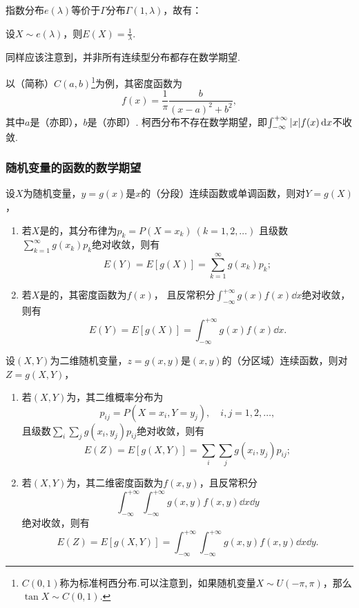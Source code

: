 指数分布\(e(\lambda)\)等价于\(\Gamma\)分布\(\Gamma(1,\lambda)\)，故有：
\begin{theorem}\label{theorem:随机变量的数字特征.指数分布的数学期望}
设\(X \sim e(\lambda)\)，则\(E(X) = \frac{1}{\lambda}\).
\end{theorem}

同样应该注意到，并非所有连续型分布都存在数学期望.

以（简称）\(C(a,b)\)\footnote{\(C(0,1)\)称为标准柯西分布.可以注意到，如果随机变量\(X \sim U(-\pi,\pi)\)，那么\(\tan X \sim C(0,1)\).}为例，其密度函数为\[
f(x) = \frac{1}{\pi} \frac{b}{(x-a)^2+b^2},
\]其中\(a\)是（亦即），\(b\)是（亦即）.
柯西分布不存在数学期望，即\(\int_{-\infty}^{+\infty} \abs{x} f(x) \dd{x}\)不收敛.

\subsubsection{随机变量的函数的数学期望}
\begin{theorem}\label{theorem:随机变量的数字特征.一维随机变量的函数的数学期望}
设\(X\)为随机变量，\(y=g(x)\)是\(x\)的（分段）连续函数或单调函数，则对\(Y=g(X)\)，%
\begin{enumerate}
\item 若\(X\)是的，其分布律为\(p_k = P(X=x_k)\ (k=1,2,\dotsc)\)
且级数\(\sum\limits_{k=1}^\infty g(x_k) p_k\)绝对收敛，则有\[
E(Y) = E[g(X)] = \sum\limits_{k=1}^\infty {g(x_k) p_k};
\]
\item 若\(X\)是的，其密度函数为\(f(x)\)，%
且反常积分\(\int_{-\infty}^{+\infty} g(x) f(x) \dd{x}\)绝对收敛，则有\[
E(Y) = E[g(X)] = \int_{-\infty}^{+\infty} g(x) f(x) \dd{x}.
\]
\end{enumerate}
\end{theorem}

\begin{theorem}\label{theorem:随机变量的数字特征.二维随机变量的函数的数学期望}
设\((X,Y)\)为二维随机变量，\(z=g(x,y)\)是\((x,y)\)的（分区域）连续函数，则对\(Z=g(X,Y)\)，\begin{enumerate}
\item 若\((X,Y)\)为，其二维概率分布为\[
p_{ij} = P(X=x_i,Y=y_j), \quad i,j=1,2,\dotsc,
\]且级数\(\sum\limits_i \sum\limits_j g(x_i,y_j) p_{ij}\)绝对收敛，则有\[
E(Z) = E[g(X,Y)] = \sum\limits_i \sum\limits_j g(x_i,y_j) p_{ij};
\]
\item 若\((X,Y)\)为，其二维密度函数为\(f(x,y)\)，且反常积分\[
\int_{-\infty}^{+\infty} \int_{-\infty}^{+\infty} g(x,y) f(x,y) \dd{x}\dd{y}
\]绝对收敛，则有\[
E(Z) = E[g(X,Y)] = \int_{-\infty}^{+\infty} \int_{-\infty}^{+\infty} g(x,y) f(x,y) \dd{x}\dd{y}.
\]
\end{enumerate}
\end{theorem}

